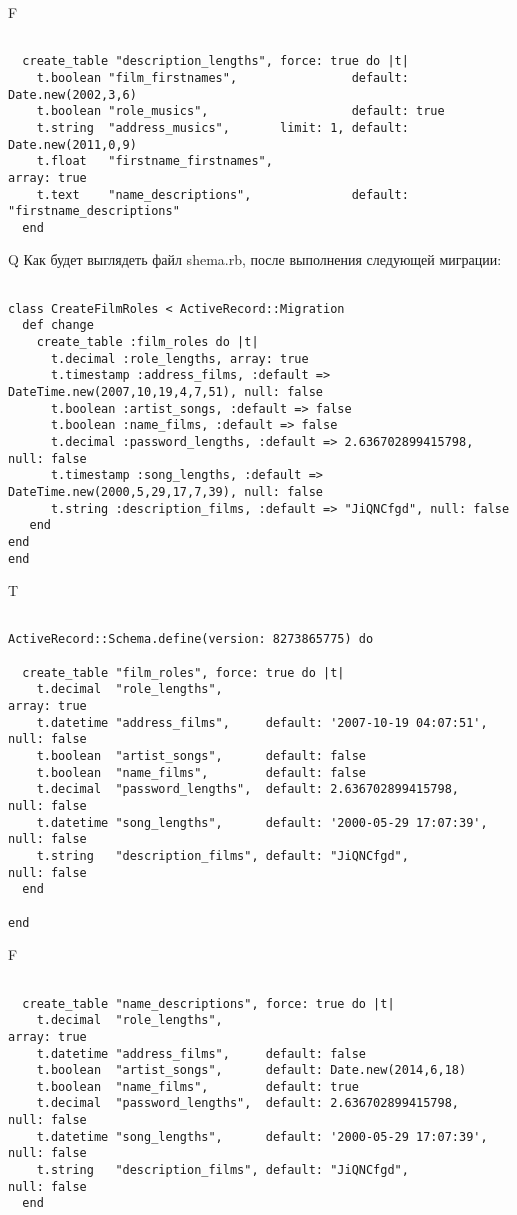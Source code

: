 F
\begin{verbatim}

  create_table "description_lengths", force: true do |t|
    t.boolean "film_firstnames",                default: Date.new(2002,3,6)
    t.boolean "role_musics",                    default: true
    t.string  "address_musics",       limit: 1, default: Date.new(2011,0,9)
    t.float   "firstname_firstnames",                                              array: true
    t.text    "name_descriptions",              default: "firstname_descriptions"
  end

\end{verbatim}

Q
Как будет выглядеть файл shema.rb, после выполнения следующей миграции:

\begin{verbatim}

class CreateFilmRoles < ActiveRecord::Migration 
  def change 
    create_table :film_roles do |t| 
      t.decimal :role_lengths, array: true
      t.timestamp :address_films, :default => DateTime.new(2007,10,19,4,7,51), null: false
      t.boolean :artist_songs, :default => false
      t.boolean :name_films, :default => false
      t.decimal :password_lengths, :default => 2.636702899415798, null: false
      t.timestamp :song_lengths, :default => DateTime.new(2000,5,29,17,7,39), null: false
      t.string :description_films, :default => "JiQNCfgd", null: false
   end
end
end
\end{verbatim}

T
\begin{verbatim}

ActiveRecord::Schema.define(version: 8273865775) do

  create_table "film_roles", force: true do |t|
    t.decimal  "role_lengths",                                                   array: true
    t.datetime "address_films",     default: '2007-10-19 04:07:51', null: false
    t.boolean  "artist_songs",      default: false
    t.boolean  "name_films",        default: false
    t.decimal  "password_lengths",  default: 2.636702899415798,     null: false
    t.datetime "song_lengths",      default: '2000-05-29 17:07:39', null: false
    t.string   "description_films", default: "JiQNCfgd",            null: false
  end

end
\end{verbatim}


F
\begin{verbatim}

  create_table "name_descriptions", force: true do |t|
    t.decimal  "role_lengths",                                                   array: true
    t.datetime "address_films",     default: false
    t.boolean  "artist_songs",      default: Date.new(2014,6,18)
    t.boolean  "name_films",        default: true
    t.decimal  "password_lengths",  default: 2.636702899415798,     null: false
    t.datetime "song_lengths",      default: '2000-05-29 17:07:39', null: false
    t.string   "description_films", default: "JiQNCfgd",            null: false
  end

\end{verbatim}

